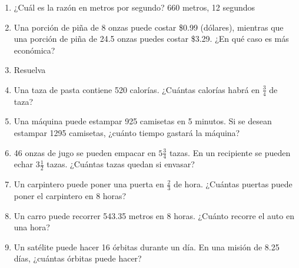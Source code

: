 \documentclass[10pt,twoside]{article}
\begin{document}
\begin{enumerate}
\item ¿Cuál es la razón en metros por segundo? 660 metros, 12 segundos
\item Una porción de piña de 8 onzas puede costar \$0.99 (dólares), mientras que una porción de piña de 24.5 onzas puedes costar \$3.29. ¿En qué caso es más económica?
\item Resuelva 
\begin{enumerate}
\end{enumerate}
\item Una taza de pasta contiene 520 calorías. ¿Cuántas calorías habrá en $\frac{3}{4}$ de taza?
\item Una máquina puede estampar 925 camisetas en 5 minutos. Si se desean estampar 1295 camisetas, ¿cuánto tiempo gastará la máquina?
\item 46 onzas de jugo se pueden empacar en $5\frac{3}{4}$ tazas. En un recipiente se pueden echar $3\frac{1}{2}$ tazas. ¿Cuántas tazas quedan si envasar?
\item Un carpintero puede poner una puerta en $\frac{2}{3}$ de hora. ¿Cuántas puertas puede poner el carpintero en 8 horas?
\item Un carro puede recorrer 543.35 metros en 8 horas. ¿Cuánto recorre el auto en una hora?
\item Un satélite puede hacer 16 órbitas durante un día. En una misión de 8.25 días, ¿cuántas órbitas puede hacer?
\end{enumerate}
\end{document}
